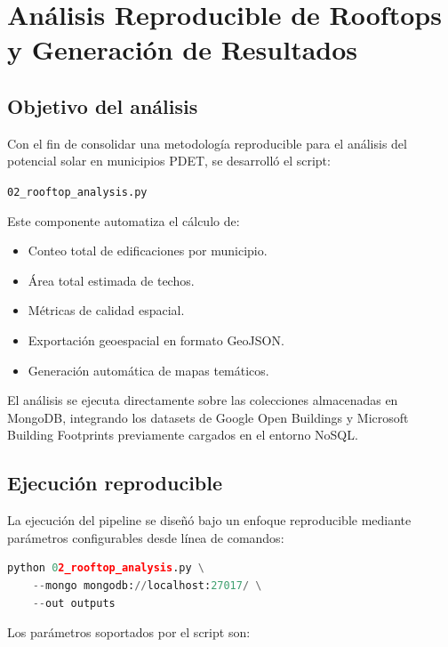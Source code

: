 \documentclass{article}
\begin{document}
\section{Análisis Reproducible de Rooftops y Generación de Resultados}

\subsection{Objetivo del análisis}

Con el fin de consolidar una metodología reproducible para el análisis del potencial solar en municipios PDET, se desarrolló el script:

\begin{center}
\texttt{02\_rooftop\_analysis.py}
\end{center}

Este componente automatiza el cálculo de:

\begin{itemize}
    \item Conteo total de edificaciones por municipio.
    \item Área total estimada de techos.
    \item Métricas de calidad espacial.
    \item Exportación geoespacial en formato GeoJSON.
    \item Generación automática de mapas temáticos.
\end{itemize}

El análisis se ejecuta directamente sobre las colecciones almacenadas en MongoDB, integrando los datasets de Google Open Buildings y Microsoft Building Footprints previamente cargados en el entorno NoSQL.

\subsection{Ejecución reproducible}

La ejecución del pipeline se diseñó bajo un enfoque reproducible mediante parámetros configurables desde línea de comandos:

\begin{lstlisting}[language=Python, caption={Ejecución del análisis reproducible}]
python 02_rooftop_analysis.py \
    --mongo mongodb://localhost:27017/ \
    --out outputs
\end{lstlisting}

Los parámetros soportados por el script son:
\end{document}
